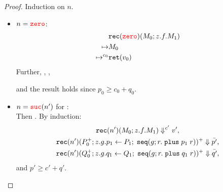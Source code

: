 \begin{proof}
  Induction on $n$.
  \begin{itemize}
    \item $n = \zero$:
      \begin{align*}
        &\rec{\zero}{M_0}{z}{f}{M_1}\\
        \mapsto& M_0\\
        \mapsto^{c_0}& \ret{v_0}\\
      \end{align*}
      Further,
  ,
      , 
      
  and the result holds since $p_0 \ge c_0 + q_0$.
\item $n = \suc{n'}$ for :\\
  Then .
  By induction: 
  \begin{gather*}
  \evalCost{\rec{n'}{M_0}{z}{f}{M_1}}{c'}{v'},\\
    \eval{\rec{n'}{P_0^+}{z}{g}{\bind{P_1}{p_1}{\seq{g}{r}{\plus\;p_1\;r}}}^+}{\bar{p'}},\\
    \eval{\rec{n'}{Q_0^+}{z}{g}{\bind{Q_1}{q_1}{\seq{g}{r}{\plus\;q_1\;r}}}^+}{\bar{q'}}, 
  \end{gather*}
      and $p' \ge c' + q'$.
  \end{itemize}
\end{proof}
\fi
